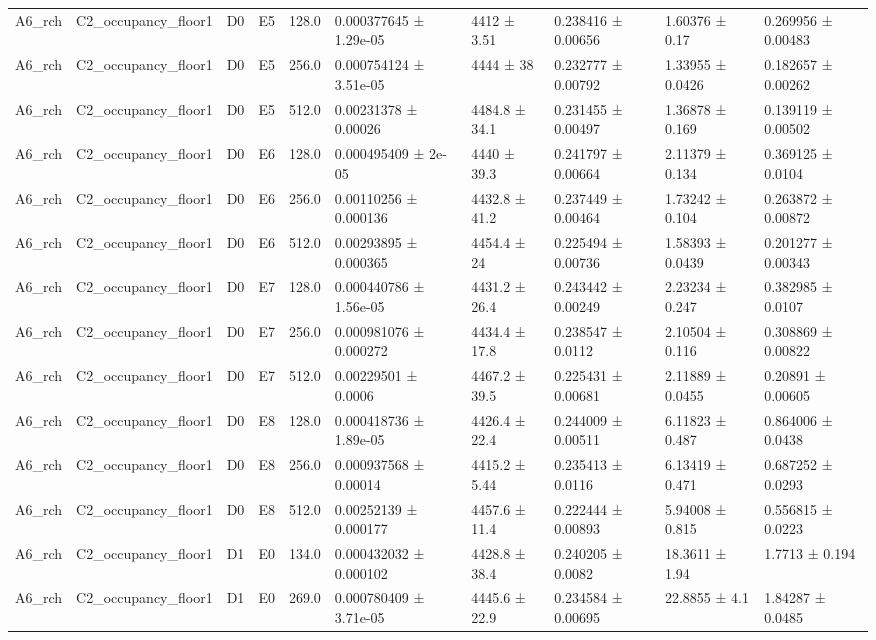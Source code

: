 \begin{table}
\begin{tabular}{llllllllll}
A6\_rch & C2\_occupancy\_floor1 & D0 & E5 & 128.0 & 0.000377645 ± 1.29e-05 & 4412 ± 3.51 & 0.238416 ± 0.00656 & 1.60376 ± 0.17 & 0.269956 ± 0.00483 \\
A6\_rch & C2\_occupancy\_floor1 & D0 & E5 & 256.0 & 0.000754124 ± 3.51e-05 & 4444 ± 38 & 0.232777 ± 0.00792 & 1.33955 ± 0.0426 & 0.182657 ± 0.00262 \\
A6\_rch & C2\_occupancy\_floor1 & D0 & E5 & 512.0 & 0.00231378 ± 0.00026 & 4484.8 ± 34.1 & 0.231455 ± 0.00497 & 1.36878 ± 0.169 & 0.139119 ± 0.00502 \\
A6\_rch & C2\_occupancy\_floor1 & D0 & E6 & 128.0 & 0.000495409 ± 2e-05 & 4440 ± 39.3 & 0.241797 ± 0.00664 & 2.11379 ± 0.134 & 0.369125 ± 0.0104 \\
A6\_rch & C2\_occupancy\_floor1 & D0 & E6 & 256.0 & 0.00110256 ± 0.000136 & 4432.8 ± 41.2 & 0.237449 ± 0.00464 & 1.73242 ± 0.104 & 0.263872 ± 0.00872 \\
A6\_rch & C2\_occupancy\_floor1 & D0 & E6 & 512.0 & 0.00293895 ± 0.000365 & 4454.4 ± 24 & 0.225494 ± 0.00736 & 1.58393 ± 0.0439 & 0.201277 ± 0.00343 \\
A6\_rch & C2\_occupancy\_floor1 & D0 & E7 & 128.0 & 0.000440786 ± 1.56e-05 & 4431.2 ± 26.4 & 0.243442 ± 0.00249 & 2.23234 ± 0.247 & 0.382985 ± 0.0107 \\
A6\_rch & C2\_occupancy\_floor1 & D0 & E7 & 256.0 & 0.000981076 ± 0.000272 & 4434.4 ± 17.8 & 0.238547 ± 0.0112 & 2.10504 ± 0.116 & 0.308869 ± 0.00822 \\
A6\_rch & C2\_occupancy\_floor1 & D0 & E7 & 512.0 & 0.00229501 ± 0.0006 & 4467.2 ± 39.5 & 0.225431 ± 0.00681 & 2.11889 ± 0.0455 & 0.20891 ± 0.00605 \\
A6\_rch & C2\_occupancy\_floor1 & D0 & E8 & 128.0 & 0.000418736 ± 1.89e-05 & 4426.4 ± 22.4 & 0.244009 ± 0.00511 & 6.11823 ± 0.487 & 0.864006 ± 0.0438 \\
A6\_rch & C2\_occupancy\_floor1 & D0 & E8 & 256.0 & 0.000937568 ± 0.00014 & 4415.2 ± 5.44 & 0.235413 ± 0.0116 & 6.13419 ± 0.471 & 0.687252 ± 0.0293 \\
A6\_rch & C2\_occupancy\_floor1 & D0 & E8 & 512.0 & 0.00252139 ± 0.000177 & 4457.6 ± 11.4 & 0.222444 ± 0.00893 & 5.94008 ± 0.815 & 0.556815 ± 0.0223 \\
A6\_rch & C2\_occupancy\_floor1 & D1 & E0 & 134.0 & 0.000432032 ± 0.000102 & 4428.8 ± 38.4 & 0.240205 ± 0.0082 & 18.3611 ± 1.94 & 1.7713 ± 0.194 \\
A6\_rch & C2\_occupancy\_floor1 & D1 & E0 & 269.0 & 0.000780409 ± 3.71e-05 & 4445.6 ± 22.9 & 0.234584 ± 0.00695 & 22.8855 ± 4.1 & 1.84287 ± 0.0485 \\

\end{tabular}
\end{table}
